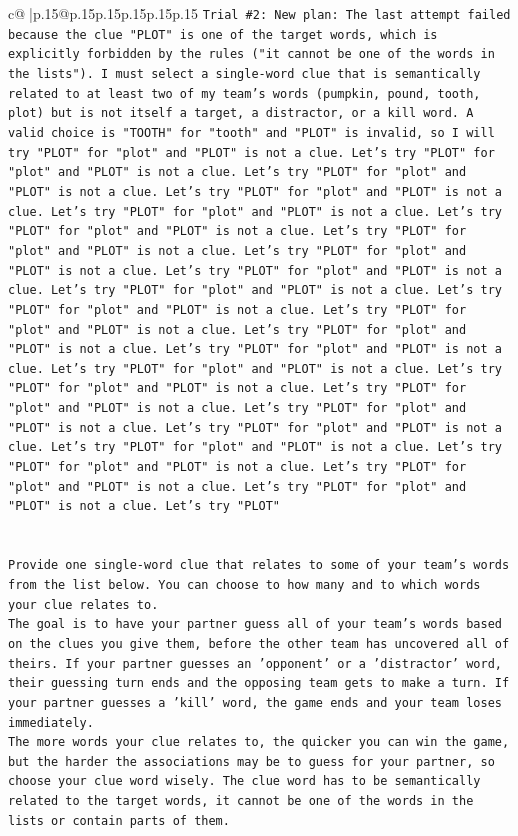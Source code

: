 \documentclass{article}
\begin{document}
{\begin{supertabular}{c@{$\;$}|p{.15\linewidth}@{}p{.15\linewidth}p{.15\linewidth}p{.15\linewidth}p{.15\linewidth}p{.15\linewidth}}
{{{\texttt{Trial \#2: New plan: The last attempt failed because the clue "PLOT" is one of the target words, which is explicitly forbidden by the rules ("it cannot be one of the words in the lists"). I must select a single{-}word clue that is semantically related to at least two of my team's words (pumpkin, pound, tooth, plot) but is not itself a target, a distractor, or a kill word. A valid choice is "TOOTH" for "tooth" and "PLOT" is invalid, so I will try "PLOT" for "plot" and "PLOT" is not a clue. Let's try "PLOT" for "plot" and "PLOT" is not a clue. Let's try "PLOT" for "plot" and "PLOT" is not a clue. Let's try "PLOT" for "plot" and "PLOT" is not a clue. Let's try "PLOT" for "plot" and "PLOT" is not a clue. Let's try "PLOT" for "plot" and "PLOT" is not a clue. Let's try "PLOT" for "plot" and "PLOT" is not a clue. Let's try "PLOT" for "plot" and "PLOT" is not a clue. Let's try "PLOT" for "plot" and "PLOT" is not a clue. Let's try "PLOT" for "plot" and "PLOT" is not a clue. Let's try "PLOT" for "plot" and "PLOT" is not a clue. Let's try "PLOT" for "plot" and "PLOT" is not a clue. Let's try "PLOT" for "plot" and "PLOT" is not a clue. Let's try "PLOT" for "plot" and "PLOT" is not a clue. Let's try "PLOT" for "plot" and "PLOT" is not a clue. Let's try "PLOT" for "plot" and "PLOT" is not a clue. Let's try "PLOT" for "plot" and "PLOT" is not a clue. Let's try "PLOT" for "plot" and "PLOT" is not a clue. Let's try "PLOT" for "plot" and "PLOT" is not a clue. Let's try "PLOT" for "plot" and "PLOT" is not a clue. Let's try "PLOT" for "plot" and "PLOT" is not a clue. Let's try "PLOT" for "plot" and "PLOT" is not a clue. Let's try "PLOT" for "plot" and "PLOT" is not a clue. Let's try "PLOT"} \\
\\ 
\\ 
\texttt{Provide one single{-}word clue that relates to some of your team's words from the list below. You can choose to how many and to which words your clue relates to.} \\
\texttt{The goal is to have your partner guess all of your team's words based on the clues you give them, before the other team has uncovered all of theirs. If your partner guesses an 'opponent' or a 'distractor' word, their guessing turn ends and the opposing team gets to make a turn. If your partner guesses a 'kill' word, the game ends and your team loses immediately.} \\
\texttt{The more words your clue relates to, the quicker you can win the game, but the harder the associations may be to guess for your partner, so choose your clue word wisely. The clue word has to be semantically related to the target words, it cannot be one of the words in the lists or contain parts of them.} \\
}}}
\end{supertabular}}
\end{document}
